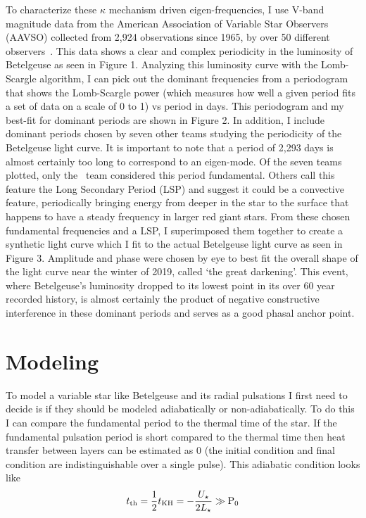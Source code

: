\documentclass[11pt,twocolumn]{article}
\begin{document}
To characterize these $\kappa$ mechanism driven eigen-frequencies, I use V-band magnitude data from the American Association of Variable Star Observers (AAVSO) collected from 2,924 observations since 1965, by over 50 different observers~\citep{aavso}. This data shows a clear and complex periodicity in the luminosity of Betelgeuse as seen in Figure 1. Analyzing this luminosity curve with the Lomb-Scargle algorithm, I can pick out the dominant frequencies from a periodogram that shows the Lomb-Scargle power (which measures how well a given period fits a set of data on a scale of 0 to 1) vs period in days. This periodogram and my best-fit for dominant periods are shown in Figure 2. In addition, I include dominant periods chosen by seven other teams studying the periodicity of the Betelgeuse light curve. It is important to note that a period of 2,293 days is almost certainly too long to correspond to an eigen-mode. Of the seven teams plotted, only the~\citep{saio} team considered this period fundamental. Others call this feature the Long Secondary Period (LSP) and suggest it could be a convective feature, periodically bringing energy from deeper in the star to the surface that happens to have a steady frequency in larger red giant stars. From these chosen fundamental frequencies and a LSP, I superimposed them together to create a synthetic light curve which I fit to the actual Betelgeuse light curve as seen in Figure 3. Amplitude and phase were chosen by eye to best fit the overall shape of the light curve near the winter of 2019, called `the great darkening'. This event, where Betelgeuse's luminosity dropped to its lowest point in its over 60 year recorded history, is almost certainly the product of negative constructive interference in these dominant periods and serves as a good phasal anchor point.

\section{Modeling}
To model a variable star like Betelgeuse and its radial pulsations I first need to decide is if they should be modeled adiabatically or non-adiabatically. To do this I can compare the fundamental period to the thermal time of the star. If the fundamental pulsation period is short compared to the thermal time then heat transfer between layers can be estimated as 0 (the initial condition and final condition are indistinguishable over a single pulse). This adiabatic condition looks like
\begin{equation}
    t_{\rm th}=\frac{1}{2}t_{\rm KH}=-\frac{U_\star}{2L_\star} \gg \rm P_0
\end{equation}
\end{document}
